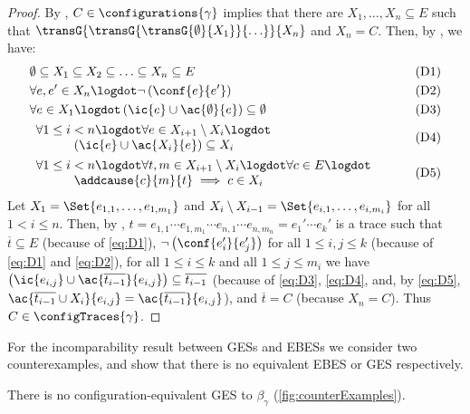 \documentclass[runningheads,a4paper]{llncs}
\begin{document}
\begin{proof}
	By , $ C \in \configurations{\gamma} $ implies that there are $ X_1, \ldots, X_n \subseteq E $ such that $ \transG{\transG{\transG{\emptyset}{X_1}}{\ldots}}{X_n} $ and $ X_n = C $.
	Then, by , we have:
	\begin{align}
		& \emptyset \subseteq X_1 \subseteq X_2 \subseteq \ldots \subseteq X_n \subseteq E & \tag{D1} \label{eq:D1}\\
		& \forall e, e' \in X_n \logdot \neg \left( \conf{e}{e'} \right) & \tag{D2} \label{eq:D2}\\
		& \forall e \in X_1 \logdot \left( \ic{e} \cup \ac{\emptyset}{e} \right) \subseteq \emptyset & \tag{D3} \label{eq:D3}\\
		& \begin{array}{l} \forall 1 \leq i < n \logdot \forall e \in X_{i + 1} \setminus X_i \logdot\\ \hspace{3em} \left( \ic{e} \cup \ac{X_i}{e} \right) \subseteq X_i \end{array} & \tag{D4} \label{eq:D4}\\
		& \begin{array}{l} \forall 1 \leq i < n \logdot \forall t, m \in X_{i + 1} \setminus X_i \logdot\forall c\in E \logdot\\ \hspace{3em} \addcause{c}{m}{t} \implies c\in  X_i  \end{array} & \tag{D5} \label{eq:D5}
	\end{align}
	Let $ X_1 = \Set{ e_{1, 1}, \ldots, e_{1, m_1} } $ and $ X_i \setminus X_{i - 1} = \Set{ e_{i, 1}, \ldots, e_{i, m_i} } $ for all $ 1 < i \leq n $.	Then, by , $ t = e_{1, 1} \cdots e_{1, m_1} \cdots e_{n, 1} \cdots e_{n, m_n} = e_1' \cdots e_k' $ is a trace such that $ \overline{t} \subseteq E $ (because of \eqref{eq:D1}), $ \neg \left( \conf{e_i'}{e_j'} \right) $ for all $ 1 \leq i, j \leq k $ (because of \eqref{eq:D1} and \eqref{eq:D2}), for all $ 1 \leq i \leq k $ and all $ 1 \leq j \leq m_i $ we have $ \left( \ic{e_{i, j}} \cup \ac{\overline{t_{i - 1}}}{e_{i, j}} \right) \subseteq \overline{t_{i - 1}} $ (because of \eqref{eq:D3}, \eqref{eq:D4}, and, by \eqref{eq:D5}, $ \ac{\overline{t_{i - 1}} \cup X_i}{e_{i, j}} = \ac{\overline{t_{i - 1}}}{e_{i, j}} $), and $ \overline{t} = C $ (because $ X_n = C $).
	Thus $ C \in \configTraces{\gamma} $.
\end{proof}

For the incomparability result between GESs and EBESs we consider two
counterexamples, and show that there is no equivalent EBES or GES respectively.
\begin{lemma}\label{lma:EBESninGES}
	There is no configuration-equivalent GES to $\beta_\gamma$ (\cf \fig\ref{fig:counterExamples}).
\end{lemma}
\end{document}
